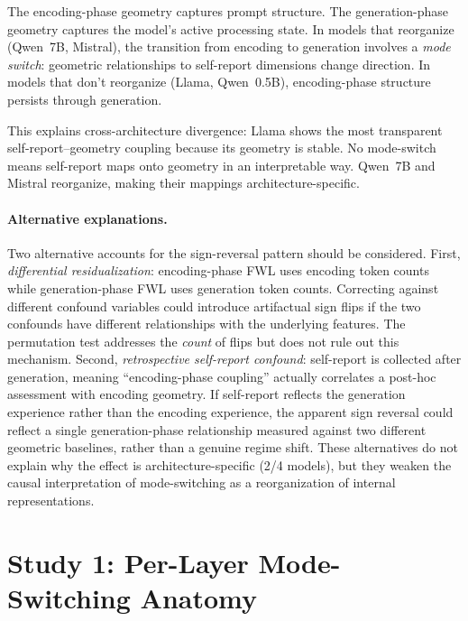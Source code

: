 \documentclass[11pt,a4paper]{article}
\begin{document}
The encoding-phase geometry captures prompt structure. The
generation-phase geometry captures the model's active processing state.
In models that reorganize (Qwen~7B, Mistral), the transition from
encoding to generation involves a \emph{mode switch}: geometric
relationships to self-report dimensions change direction. In models that
don't reorganize (Llama, Qwen~0.5B), encoding-phase structure persists
through generation.

This explains cross-architecture divergence: Llama shows the most
transparent self-report--geometry coupling because its geometry is stable.
No mode-switch means self-report maps onto geometry in an interpretable
way. Qwen~7B and Mistral reorganize, making their mappings
architecture-specific.

\paragraph{Alternative explanations.} Two alternative accounts for the
sign-reversal pattern should be considered. First, \emph{differential
residualization}: encoding-phase FWL uses encoding token counts while
generation-phase FWL uses generation token counts. Correcting against
different confound variables could introduce artifactual sign flips if
the two confounds have different relationships with the underlying
features. The permutation test addresses the \emph{count} of flips but
does not rule out this mechanism. Second, \emph{retrospective self-report
confound}: self-report is collected after generation, meaning
``encoding-phase coupling'' actually correlates a post-hoc assessment
with encoding geometry. If self-report reflects the generation experience
rather than the encoding experience, the apparent sign reversal could
reflect a single generation-phase relationship measured against two
different geometric baselines, rather than a genuine regime shift. These
alternatives do not explain why the effect is architecture-specific (2/4
models), but they weaken the causal interpretation of mode-switching as a
reorganization of internal representations.

\section{Study 1: Per-Layer Mode-Switching Anatomy}
\label{sec:study1}
\end{document}
